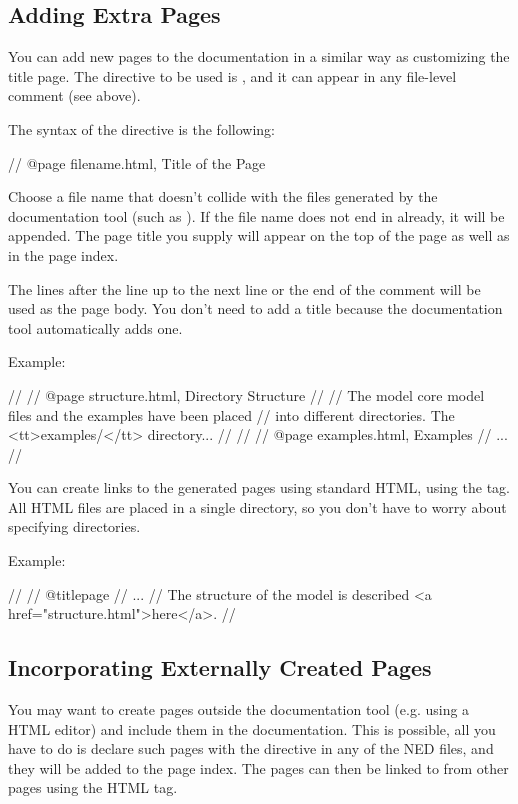 \subsection{Adding Extra Pages}

You can add new pages to the documentation in a similar way as customizing
the title page. The directive to be used is , and it can
appear in any file-level comment (see above).

The syntax of the  directive is the following:

\begin{ned}
// @page filename.html, Title of the Page
\end{ned}

Choose a file name that doesn't collide with the files generated
by the documentation tool (such as ). If the file name
does not end in  already, it will be appended.
The page title you supply will appear on the top of the page as well as
in the page index.

The lines after the  line up to the next  line
or the end of the comment will be used as the page body.
You don't need to add a title because the documentation tool
automatically adds one.

Example:
\begin{ned}
//
// @page structure.html, Directory Structure
//
// The model core model files and the examples have been placed
// into different directories. The <tt>examples/</tt> directory...
//
//
// @page examples.html, Examples
// ...
//
\end{ned}

You can create links to the generated pages using standard HTML,
using the  tag. All HTML files are
placed in a single directory, so you don't have to worry about
specifying directories.

Example:
\begin{ned}
//
// @titlepage
// ...
// The structure of the model is described <a href="structure.html">here</a>.
//
\end{ned}


\subsection{Incorporating Externally Created Pages}

You may want to create pages outside the documentation tool
(e.g. using a HTML editor) and include them in the documentation.
This is possible, all you have to do is declare such pages with
the  directive in any of the NED files, and
they will be added to the page index. The pages can then be linked to
from other pages using the HTML  tag.

